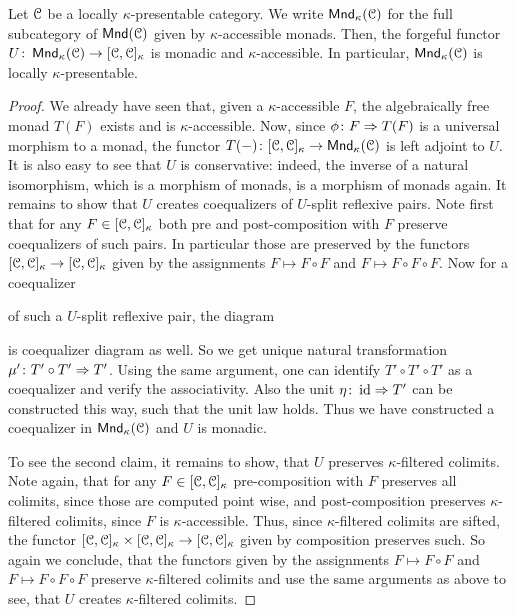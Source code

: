 \documentclass[a4paper,11pt,oneside,openany]{scrbook}
\begin{document}
\begin{thm}
	Let $\operatorname{\mathcal{C}}$ be a locally $\kappa$-presentable category. We write $\operatorname{\mathsf{Mnd}}_\kappa(\operatorname{\mathcal{C}})$ for the full subcategory of $\operatorname{\mathsf{Mnd}}(\operatorname{\mathcal{C}})$ given by $\kappa$-accessible monads. Then, the forgeful functor $U\colon \operatorname{\mathsf{Mnd}}_\kappa(\operatorname{\mathcal{C}})\rightarrow[\operatorname{\mathcal{C}},\operatorname{\mathcal{C}}]_\kappa$ is monadic and $\kappa$-accessible. In particular, $\operatorname{\mathsf{Mnd}}_\kappa(\operatorname{\mathcal{C}})$ is locally $\kappa$-presentable.
\end{thm}

\begin{proof}
	We already have seen that, given a $\kappa$-accessible $F$, the algebraically free monad $T(F)$ exists and is $\kappa$-accessible. Now, since
	$\phi \colon F \Rightarrow T(F)$ is a universal morphism to a monad, the functor $T(-) \colon [\operatorname{\mathcal{C}},\operatorname{\mathcal{C}}]_{\kappa} \to \operatorname{\mathsf{Mnd}}_{\kappa}(\operatorname{\mathcal{C}})$ is left adjoint to $U$.
	It is also easy to see that $U$ is conservative: indeed, the inverse of a natural isomorphism, which is a morphism of monads, is a morphism of monads again.
	It remains to show that $U$ creates coequalizers of $U$-split reflexive pairs. Note first that for any $F \in [\operatorname{\mathcal{C}},\operatorname{\mathcal{C}}]_{\kappa}$ both pre and post-composition
	with $F$ preserve coequalizers of such pairs. In particular those are preserved by the functors $[\operatorname{\mathcal{C}},\operatorname{\mathcal{C}}]_{\kappa} \to [\operatorname{\mathcal{C}},\operatorname{\mathcal{C}}]_{\kappa}$ given by the assignments
	$F \mapsto F \circ F$ and $F \mapsto F \circ F \circ F$. Now for a coequalizer
	\begin{center}
	\end{center}
	of such a $U$-split reflexive pair, the diagram
	\begin{center}
	\end{center}
	is coequalizer diagram as well. So we get unique natural transformation $\mu' \colon T' \circ T' \Rightarrow T'$.  Using the same argument, one can identify
	$T' \circ T' \circ T'$ as a coequalizer and verify the associativity. Also the unit $\eta \colon \operatorname{id} \Rightarrow T'$ can be constructed this way, such that the unit law
	holds. Thus we have constructed a coequalizer in $\operatorname{\mathsf{Mnd}}_{\kappa}(\operatorname{\mathcal{C}})$ and $U$ is monadic.

	To see the second claim, it remains to show, that $U$ preserves
	$\kappa$-filtered colimits. Note again, that for any $F \in [\operatorname{\mathcal{C}},\operatorname{\mathcal{C}}]_{\kappa}$ pre-composition with $F$ preserves all colimits, since those are computed point wise,
	and post-composition preserves $\kappa$-filtered colimits, since $F$ is $\kappa$-accessible.  Thus, since $\kappa$-filtered colimits are sifted, the functor
	$[\operatorname{\mathcal{C}},\operatorname{\mathcal{C}}]_{\kappa} \times [\operatorname{\mathcal{C}},\operatorname{\mathcal{C}}]_{\kappa} \to [\operatorname{\mathcal{C}},\operatorname{\mathcal{C}}]_{\kappa}$ given by composition preserves such. So again we conclude, that the functors given by the
	assignments $F \mapsto F \circ F$ and $F \mapsto F \circ F \circ F$ preserve $\kappa$-filtered colimits and use the same arguments as above to see, that
	$U$ creates $\kappa$-filtered colimits.
\end{proof}
\end{document}
